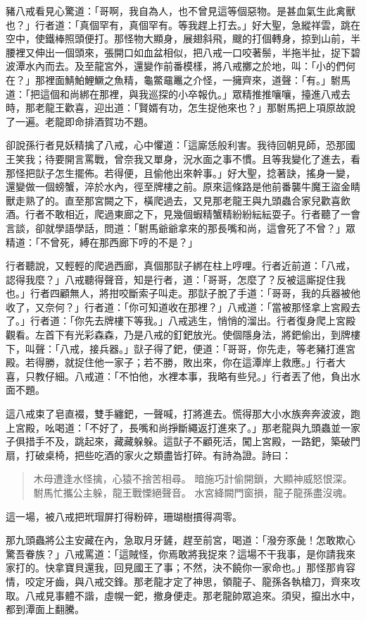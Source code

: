豬八戒看見心驚道：「哥啊，我自為人，也不曾見這等個惡物。是甚血氣生此禽獸也？」行者道：「真個罕有，真個罕有。等我趕上打去。」好大聖，急縱祥雲，跳在空中，使鐵棒照頭便打。那怪物大顯身，展翅斜飛，颼的打個轉身，掠到山前，半腰裡又伸出一個頭來，張開口如血盆相似，把八戒一口咬著鬃，半拖半扯，捉下碧波潭水內而去。及至龍宮外，還變作前番模樣，將八戒擲之於地，叫：「小的們何在？」那裡面鯖鮊鯉鱖之魚精，龜鱉黿鼉之介怪，一擁齊來，道聲：「有。」駙馬道：「把這個和尚綁在那裡，與我巡探的小卒報仇。」眾精推推嚷嚷，擡進八戒去時，那老龍王歡喜，迎出道：「賢婿有功，怎生捉他來也？」那駙馬把上項原故說了一遍。老龍即命排酒賀功不題。

卻說孫行者見妖精擒了八戒，心中懼道：「這廝恁般利害。我待回朝見師，恐那國王笑我；待要開言罵戰，曾奈我又單身，況水面之事不慣。且等我變化了進去，看那怪把獃子怎生擺佈。若得便，且偷他出來幹事。」好大聖，捻著訣，搖身一變，還變做一個螃蟹，淬於水內，徑至牌樓之前。原來這條路是他前番襲牛魔王盜金睛獸走熟了的。直至那宮闕之下，橫爬過去，又見那老龍王與九頭蟲合家兒歡喜飲酒。行者不敢相近，爬過東廊之下，見幾個蝦精蟹精紛紛紜紜耍子。行者聽了一會言談，卻就學語學話，問道：「駙馬爺爺拿來的那長嘴和尚，這會死了不曾？」眾精道：「不曾死，縛在那西廊下哼的不是？」

行者聽說，又輕輕的爬過西廊，真個那獃子綁在柱上哼哩。行者近前道：「八戒，認得我麼？」八戒聽得聲音，知是行者，道：「哥哥，怎麼了？反被這廝捉住我也。」行者四顧無人，將拑咬斷索子叫走。那獃子脫了手道：「哥哥，我的兵器被他收了，又奈何？」行者道：「你可知道收在那裡？」八戒道：「當被那怪拿上宮殿去了。」行者道：「你先去牌樓下等我。」八戒逃生，悄悄的溜出。行者復身爬上宮殿觀看。左首下有光彩森森，乃是八戒的釘鈀放光。使個隱身法，將鈀偷出，到牌樓下，叫聲：「八戒，接兵器。」獃子得了鈀，便道：「哥哥，你先走，等老豬打進宮殿。若得勝，就捉住他一家子；若不勝，敗出來，你在這潭岸上救應。」行者大喜，只教仔細。八戒道：「不怕他，水裡本事，我略有些兒。」行者丟了他，負出水面不題。

這八戒束了皂直裰，雙手纏鈀，一聲喊，打將進去。慌得那大小水族奔奔波波，跑上宮殿，吆喝道：「不好了，長嘴和尚掙斷繩返打進來了。」那老龍與九頭蟲並一家子俱措手不及，跳起來，藏藏躲躲。這獃子不顧死活，闖上宮殿，一路鈀，築破門扇，打破桌椅，把些吃酒的家火之類盡皆打碎。有詩為證。詩曰：
\begin{quote}
木母遭逢水怪擒，心猿不捨苦相尋。
暗施巧計偷開鎖，大顯神威怒恨深。
駙馬忙攜公主躲，龍王戰慄絕聲音。
水宮絳闕門窗損，龍子龍孫盡沒魂。
\end{quote}

這一場，被八戒把玳瑁屏打得粉碎，珊瑚樹摜得凋零。

那九頭蟲將公主安藏在內，急取月牙鏟，趕至前宮，喝道：「潑夯豕彘！怎敢欺心驚吾眷族？」八戒罵道：「這賊怪，你焉敢將我捉來？這場不干我事，是你請我來家打的。快拿寶貝還我，回見國王了事；不然，決不饒你一家命也。」那怪那肯容情，咬定牙齒，與八戒交鋒。那老龍才定了神思，領龍子、龍孫各執槍刀，齊來攻取。八戒見事體不諧，虛幌一鈀，撤身便走。那老龍帥眾追來。須臾，攛出水中，都到潭面上翻騰。

